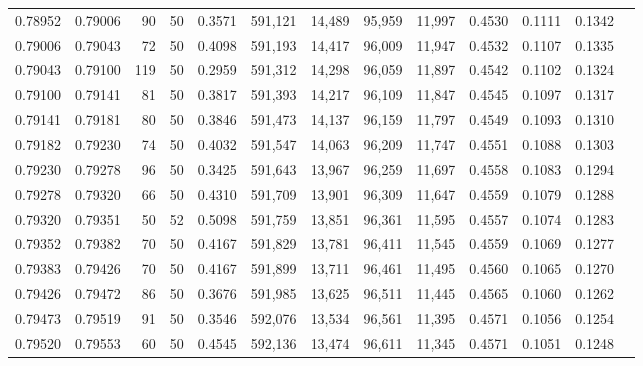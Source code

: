 \begin{tabular}{rrrrrrrrrrrrr}
0.78952 & 0.79006 &    90 &  50 &                                     0.3571 & 591,121 &  14,489 &  95,959 &  11,997 & 0.4530 & 0.1111 & 0.1342 \\
0.79006 & 0.79043 &    72 &  50 &                                     0.4098 & 591,193 &  14,417 &  96,009 &  11,947 & 0.4532 & 0.1107 & 0.1335 \\
0.79043 & 0.79100 &   119 &  50 &                                     0.2959 & 591,312 &  14,298 &  96,059 &  11,897 & 0.4542 & 0.1102 & 0.1324 \\
0.79100 & 0.79141 &    81 &  50 &                                     0.3817 & 591,393 &  14,217 &  96,109 &  11,847 & 0.4545 & 0.1097 & 0.1317 \\
0.79141 & 0.79181 &    80 &  50 &                                     0.3846 & 591,473 &  14,137 &  96,159 &  11,797 & 0.4549 & 0.1093 & 0.1310 \\
0.79182 & 0.79230 &    74 &  50 &                                     0.4032 & 591,547 &  14,063 &  96,209 &  11,747 & 0.4551 & 0.1088 & 0.1303 \\
0.79230 & 0.79278 &    96 &  50 &                                     0.3425 & 591,643 &  13,967 &  96,259 &  11,697 & 0.4558 & 0.1083 & 0.1294 \\
0.79278 & 0.79320 &    66 &  50 &                                     0.4310 & 591,709 &  13,901 &  96,309 &  11,647 & 0.4559 & 0.1079 & 0.1288 \\
0.79320 & 0.79351 &    50 &  52 &                                     0.5098 & 591,759 &  13,851 &  96,361 &  11,595 & 0.4557 & 0.1074 & 0.1283 \\
0.79352 & 0.79382 &    70 &  50 &                                     0.4167 & 591,829 &  13,781 &  96,411 &  11,545 & 0.4559 & 0.1069 & 0.1277 \\
0.79383 & 0.79426 &    70 &  50 &                                     0.4167 & 591,899 &  13,711 &  96,461 &  11,495 & 0.4560 & 0.1065 & 0.1270 \\
0.79426 & 0.79472 &    86 &  50 &                                     0.3676 & 591,985 &  13,625 &  96,511 &  11,445 & 0.4565 & 0.1060 & 0.1262 \\
0.79473 & 0.79519 &    91 &  50 &                                     0.3546 & 592,076 &  13,534 &  96,561 &  11,395 & 0.4571 & 0.1056 & 0.1254 \\
0.79520 & 0.79553 &    60 &  50 &                                     0.4545 & 592,136 &  13,474 &  96,611 &  11,345 & 0.4571 & 0.1051 & 0.1248 \\

\end{tabular}
